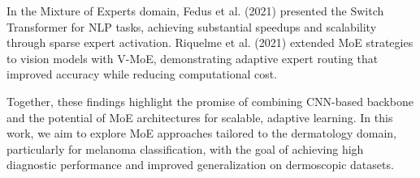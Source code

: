 In the Mixture of Experts domain, Fedus et al. (2021) presented the Switch Transformer for NLP tasks, achieving substantial speedups and scalability through sparse expert activation. Riquelme et al. (2021) extended MoE strategies to vision models with V-MoE, demonstrating adaptive expert routing that improved accuracy while reducing computational cost.

Together, these findings highlight the promise of combining CNN-based backbone  and the potential of MoE architectures for scalable, adaptive learning. In this work, we aim to explore MoE approaches tailored to the dermatology domain, particularly for melanoma classification, with the goal of achieving high diagnostic performance and improved generalization on  dermoscopic datasets.